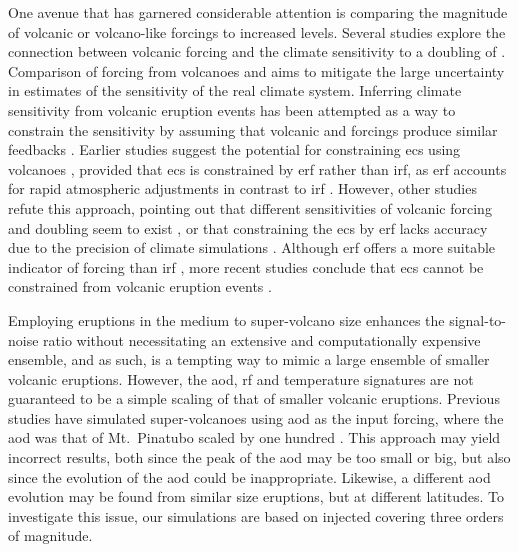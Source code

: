 \documentclass{ametsocV6.1}
\newcommand{\iso}[1][i]{{#1}njected \ce{SO2}}
\begin{document}
One avenue that has garnered considerable attention is comparing the magnitude of
volcanic or volcano-like forcings to increased  levels. Several studies explore
the connection between volcanic forcing and the climate sensitivity to a doubling of
\citep{boer2007,marvel2016,merlis2014,ollila2016,richardson2019,salvi2022,wigley2005}.
Comparison of forcing from volcanoes and  aims to mitigate the large uncertainty
in estimates of the sensitivity of the real climate system. Inferring climate
sensitivity from volcanic eruption events has been attempted as a way to constrain the
sensitivity \citep{boer2007} by assuming that volcanic and  forcings produce
similar feedbacks \citep{pauling2023}. Earlier studies suggest the potential for
constraining \gls{ecs} using volcanoes \citep{bender2010}, provided that \gls{ecs} is
constrained by \gls{erf} rather than \gls{irf}, as \gls{erf} accounts for rapid
atmospheric adjustments in contrast to \gls{irf} \citep{richardson2019}. However, other
studies refute this approach, pointing out that different sensitivities of volcanic
forcing and  doubling seem to exist \citep{douglass2006}, or that constraining
the \gls{ecs} by \gls{erf} lacks accuracy due to the precision of climate simulations
\citep{boer2007,salvi2022}. Although \gls{erf} offers a more suitable indicator of
forcing than \gls{irf} \citep{marvel2016,richardson2019}, more recent studies conclude
that \gls{ecs} cannot be constrained from volcanic eruption events \citep{pauling2023}.

Employing eruptions in the medium to super-volcano size enhances the signal-to-noise
ratio without necessitating an extensive and computationally expensive ensemble, and as
such, is a tempting way to mimic a large ensemble of smaller volcanic eruptions.
However, the \gls{aod}, \gls{rf} and temperature signatures are not guaranteed to be a
simple scaling of that of smaller volcanic eruptions. Previous studies have simulated
super-volcanoes using \gls{aod} as the input forcing, where the \gls{aod} was that of
Mt.\ Pinatubo scaled by one hundred \citep{jones2005}. This approach may yield incorrect
results, both since the peak of the \gls{aod} may be too small or big, but also since
the evolution of the \gls{aod} could be inappropriate. Likewise, a different \gls{aod}
evolution may be found from similar size eruptions, but at different latitudes. To
investigate this issue, our simulations are based on \iso{} covering three orders of
magnitude.
\end{document}
